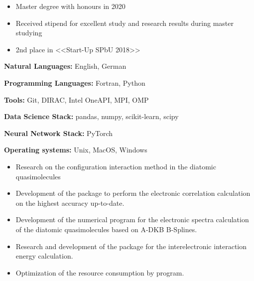 \begin{itemize}
    \item Master degree with honours in 2020
    \item Received stipend for excellent study and research results during master studying
    \item 2nd place in <<Start-Up SPbU 2018>>
\end{itemize}

\textbf{Natural Languages:} English, German

\textbf{Programming Languages:} Fortran, Python

\textbf{Tools:} Git, DIRAC, Intel OneAPI, MPI, OMP

\textbf{Data Science Stack:} pandas, numpy, scikit-learn, scipy

\textbf{Neural Network Stack:} PyTorch

\textbf{Operating systems:} Unix, MacOS, Windows






\vspace{0.15cm}
\begin{itemize}
\item Research on the configuration interaction method in the diatomic quasimolecules
\item Development of the package to perform the electronic correlation calculation on the highest accuracy up-to-date.
\end{itemize}

\begin{itemize}
\item Development of the numerical program for the electronic spectra calculation of the diatomic quasimolecules based on A-DKB B-Splines.
\item Research and development of the package for the interelectronic interaction energy calculation.
\item Optimization of the resource consumption by program.
\end{itemize}

